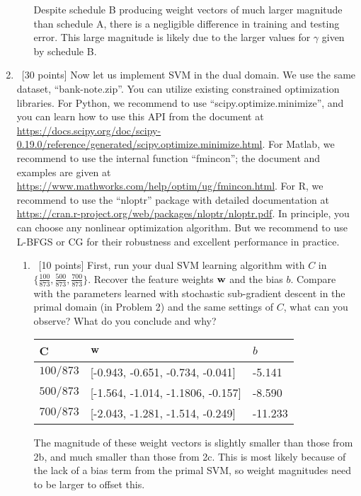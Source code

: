 \documentclass[12pt, fullpage,letterpaper]{article}
\begin{document}
\begin{enumerate}
\begin{enumerate}
		Despite schedule B producing weight vectors of much larger magnitude than schedule A, there is a negligible difference in training and testing error. This large magnitude is likely due to the larger values for $\gamma$ given by schedule B.
	
	\end{enumerate}


\item~[30 points] Now let us implement SVM in the dual domain. We use the same dataset, ``bank-note.zip''. You can utilize existing constrained optimization libraries. For Python, we recommend to use ``scipy.optimize.minimize'', and you can learn how to use this API from the document at \url{https://docs.scipy.org/doc/scipy-0.19.0/reference/generated/scipy.optimize.minimize.html}.
For Matlab, we recommend to use the internal function ``fmincon''; the document and examples are given at \url{https://www.mathworks.com/help/optim/ug/fmincon.html}. For R, we recommend to use the ``nloptr'' package with detailed documentation at \url{https://cran.r-project.org/web/packages/nloptr/nloptr.pdf}. In principle, you can choose any nonlinear optimization algorithm. But we recommend to use L-BFGS or CG for their robustness and excellent performance in practice. 

\begin{enumerate}
	\item ~[10 points] First, run your dual SVM learning algorithm with   $C$ in $\{\frac{100}{873}, \frac{500}{873}, \frac{700}{873}\}$. Recover the feature weights ${\bf w}$ and the bias $b$. Compare with the parameters learned with stochastic sub-gradient descent in the primal domain (in Problem 2) and the same settings of $C$, what can you observe? What do you conclude and why?
	
	\begin{table}[h]
		\begin{tabular}{l||ll}
			C & ${\bf w}$ & $b$ \\
			\hline\hline
			$100/873$ & [-0.943, -0.651, -0.734, -0.041] & -5.141 \\
			$500/873$ & [-1.564, -1.014, -1.1806, -0.157] & -8.590 \\
			$700/873$ & [-2.043, -1.281, -1.514, -0.249] & -11.233 \\
		\end{tabular}
	\end{table}

	The magnitude of these weight vectors is slightly smaller than those from 2b, and much smaller than those from 2c. This is most likely because of the lack of a bias term from the primal SVM, so weight magnitudes need to be larger to offset this.
	

\end{enumerate}
\end{enumerate}
\end{document}
